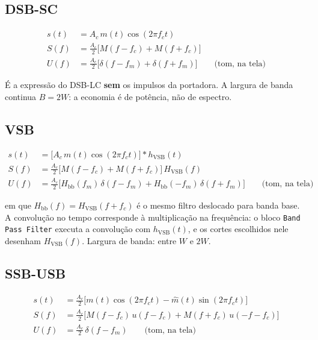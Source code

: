 \documentclass[11pt,a4paper]{article}
\begin{document}
\subsection*{DSB-SC}

\begin{align}
      s(t) & = A_c\,m(t)\cos(2\pi f_c t)                             \\
      S(f) & = \tfrac{A_c}{2}\big[M(f-f_c) + M(f+f_c)\big]           \\
      U(f) & = \tfrac{A_c}{2}\big[\delta(f-f_m) + \delta(f+f_m)\big]
      \qquad \text{(tom, na tela)}
\end{align}

É a expressão do DSB-LC \textbf{sem} os impulsos da portadora. A largura de
banda continua $B = 2W$: a economia é de potência, não de espectro.

\subsection*{VSB}

\begin{align}
      s(t) & = \big[A_c\,m(t)\cos(2\pi f_c t)\big] * h_\text{VSB}(t)        \\
      S(f) & = \tfrac{A_c}{2}\big[M(f-f_c) + M(f+f_c)\big]\,H_\text{VSB}(f) \\
      U(f) & = \tfrac{A_c}{2}\big[H_\text{bb}(f_m)\,\delta(f-f_m)
            + H_\text{bb}(-f_m)\,\delta(f+f_m)\big]
      \qquad \text{(tom, na tela)}
\end{align}

em que $H_\text{bb}(f) = H_\text{VSB}(f + f_c)$ é o mesmo filtro deslocado para
banda base. A convolução no tempo corresponde à multiplicação na frequência:
o bloco \texttt{Band Pass Filter} executa a convolução com $h_\text{VSB}(t)$, e
os cortes escolhidos nele desenham $H_\text{VSB}(f)$. Largura de banda: entre
$W$ e $2W$.

\subsection*{SSB-USB}

\begin{align}
      s(t) & = \tfrac{A_c}{2}\big[m(t)\cos(2\pi f_c t) - \hat{m}(t)\sin(2\pi f_c t)\big] \\
      S(f) & = \tfrac{A_c}{2}\big[M(f-f_c)\,u(f-f_c) + M(f+f_c)\,u(-f-f_c)\big]          \\
      U(f) & = \tfrac{A_c}{2}\,\delta(f-f_m)
      \qquad \text{(tom, na tela)}
\end{align}
\end{document}

